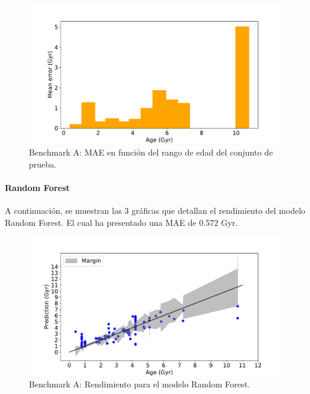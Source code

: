 \begin{figure}[H]
\begin{center}
 \includegraphics[width=0.8\linewidth]{Figuras/Experimentos/B_A_knn_3.pdf}
\end{center}
\caption{Benchmark A: MAE en función del rango de edad del conjunto de prueba.}
 \label{fig:benchA_details_knn_3}
\end{figure}

\paragraph{Random Forest} 
A continuación, se muestran las 3 gráficas que detallan el rendimiento del modelo Random Forest. El cual ha presentado una MAE de 0.572 Gyr.

\begin{figure}[H]
\begin{center}
 \includegraphics[width=0.8\linewidth]{Figuras/Experimentos/B_A_rf_1.pdf}
\end{center}
\caption{Benchmark A: Rendimiento para el modelo Random Forest.}
 \label{fig:benchA_details_rf_1}
\end{figure}

